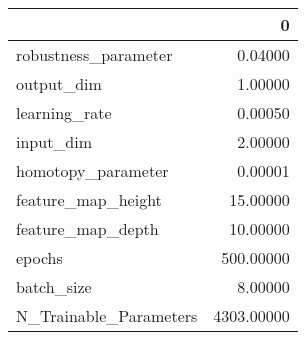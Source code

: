 \begin{tabular}{lr}
\toprule
{} &           0 \\
\midrule
robustness\_parameter   &     0.04000 \\
output\_dim             &     1.00000 \\
learning\_rate          &     0.00050 \\
input\_dim              &     2.00000 \\
homotopy\_parameter     &     0.00001 \\
feature\_map\_height     &    15.00000 \\
feature\_map\_depth      &    10.00000 \\
epochs                 &   500.00000 \\
batch\_size             &     8.00000 \\
N\_Trainable\_Parameters &  4303.00000 \\
\bottomrule
\end{tabular}
